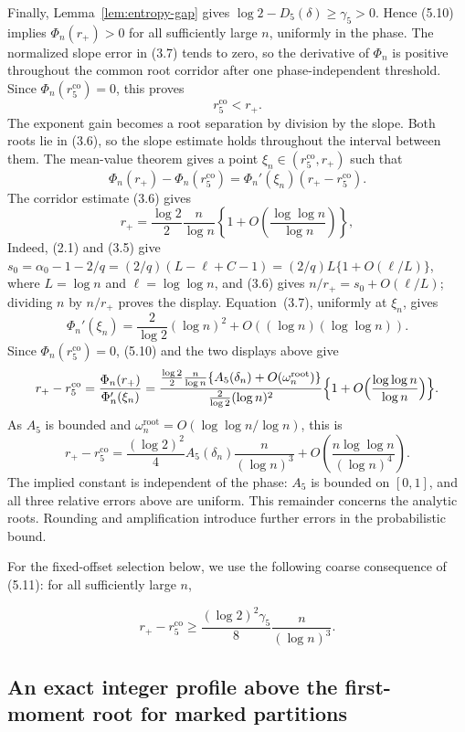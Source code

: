 \documentclass[a4paper,10pt,reqno]{amsart}
\numberwithin{equation}{section}
\theoremstyle{plain}
\theoremstyle{remark}
\begin{document}
Finally, Lemma~\ref{lem:entropy-gap} gives
$\log 2-D_5(\delta)\ge\gamma_5>0$. Hence (5.10) implies
$\Phi_n(r_+)>0$ for all sufficiently large $n$, uniformly in the phase. The
normalized slope error in (3.7) tends to zero, so the derivative of $\Phi_n$
is positive throughout the common root corridor after one phase-independent
threshold. Since $\Phi_n(r_5^{\mathrm{co}})=0$, this proves
\[
  r_5^{\mathrm{co}}<r_+.
\]
The exponent gain becomes a root separation by division by the slope.
Both roots lie in (3.6), so the slope estimate holds throughout the interval
between them. The mean-value theorem gives a point
\(\xi_n\in(r_5^{\mathrm{co}},r_+)\) such that
\[
 \Phi_n(r_+)-\Phi_n(r_5^{\mathrm{co}})
 =\Phi_n'(\xi_n)(r_+-r_5^{\mathrm{co}}).
\]
The corridor estimate (3.6) gives
\[
  r_+
  =\frac{\log 2}{2}\frac n{\log n}
    \left\{1+O\!\left(\frac{\log\log n}{\log n}\right)\right\},
\]
Indeed, (2.1) and (3.5) give
$s_0=\alpha_0-1-2/q=(2/q)(L-\ell+C-1)=(2/q)L\{1+O(\ell/L)\}$, where
$L=\log n$ and $\ell=\log\log n$, and (3.6) gives $n/r_+=s_0+O(\ell/L)$;
dividing $n$ by $n/r_+$ proves the display. Equation~(3.7), uniformly at
\(\xi_n\), gives
\[
 \Phi_n'(\xi_n)=\frac2{\log 2}(\log n)^2
                 +O((\log n)(\log\log n)).
\]
Since $\Phi_n(r_5^{\mathrm{co}})=0$, (5.10) and the two displays above give
\[
 r_+-r_5^{\mathrm{co}}=\frac{\Phi_n(r_+)}{\Phi_n'(\xi_n)}
 =\frac{\frac{\log 2}2\frac n{\log n}
        \{A_5(\delta_n)+O(\omega_n^{\mathrm{root}})\}}
        {\frac2{\log 2}(\log n)^2}
  \Bigl\{1+O\Bigl(\frac{\log\log n}{\log n}\Bigr)\Bigr\}.
\]
As $A_5$ is bounded and $\omega_n^{\mathrm{root}}=O(\log\log n/\log n)$,
this is
\[
 r_+-r_5^{\mathrm{co}}
 =\frac{(\log 2)^2}{4}A_5(\delta_n)\frac n{(\log n)^3}
   +O\!\left(\frac{n\log\log n}{(\log n)^4}\right).
 \tag{5.11}
\]
The implied constant is independent of the phase: $A_5$ is bounded on
$[0,1]$, and all three relative errors above are uniform. This remainder
concerns the analytic roots. Rounding and amplification introduce further
errors in the probabilistic bound.

For the fixed-offset selection below, we use the following coarse consequence
of (5.11): for all sufficiently large \(n\),

\[
 r_+-r_5^{\mathrm{co}}\ge\frac{(\log 2)^2\gamma_5}{8}\frac n{(\log n)^3}.     \tag{5.12}
\]

\subsection{An exact integer profile above the first-moment root for marked partitions}
\end{document}

